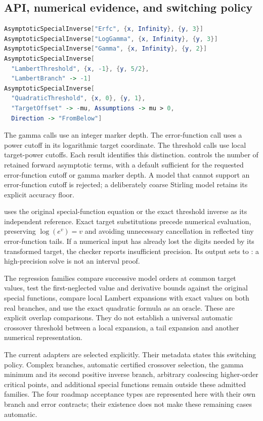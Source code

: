 \subsection{API, numerical evidence, and switching policy}

\begin{lstlisting}[language=Mathematica]
AsymptoticSpecialInverse["Erfc", {x, Infinity}, {y, 3}]
AsymptoticSpecialInverse["LogGamma", {x, Infinity}, {y, 3}]
AsymptoticSpecialInverse["Gamma", {x, Infinity}, {y, 2}]
AsymptoticSpecialInverse[
  "LambertThreshold", {x, -1}, {y, 5/2},
  "LambertBranch" -> -1]
AsymptoticSpecialInverse[
  "QuadraticThreshold", {x, 0}, {y, 1},
  "TargetOffset" -> -mu, Assumptions -> mu > 0,
  Direction -> "FromBelow"]
\end{lstlisting}

The gamma calls use an integer marker depth. The error-function call uses
a power cutoff in its logarithmic target coordinate. The threshold calls
use local target-power cutoffs. Each result identifies this distinction.
 controls the number of retained forward asymptotic
terms, with a default sufficient for the requested error-function cutoff
or gamma marker depth. A model that cannot support an error-function
cutoff is rejected; a deliberately coarse Stirling model retains its
explicit accuracy floor.

 uses the original special-function
equation or the exact threshold inverse as its independent reference.
Exact target substitutions precede numerical evaluation, preserving
$\log(e^v)=v$ and avoiding unnecessary cancellation in reflected tiny
error-function tails. If a numerical input has already lost the digits
needed by its transformed target, the checker reports insufficient
precision. Its output sets  to : a
high-precision solve is not an interval proof.

The regression families compare successive model orders at common target
values, test the first-neglected value and derivative bounds against the
original special functions, compare local Lambert expansions with exact
 values on both real branches, and use the exact quadratic
formula as an oracle. These are explicit overlap comparisons. They do not
establish a universal automatic crossover threshold between a local
expansion, a tail expansion and another numerical representation.

The current adapters are selected explicitly. Their metadata states this
switching policy. Complex branches, automatic certified crossover
selection, the gamma minimum and its second positive inverse branch,
arbitrary coalescing higher-order critical points, and additional special
functions remain outside these admitted families. The four roadmap
acceptance types are represented here with their own branch and error
contracts; their existence does not make these remaining cases automatic.
